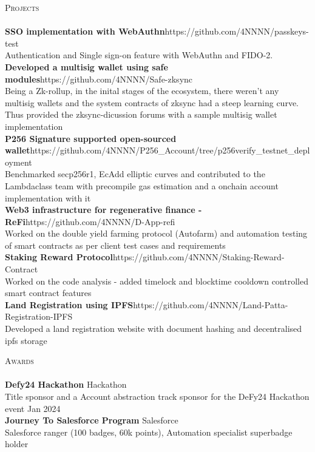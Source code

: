 \documentclass[a4paper]{article}
\newcommand{\lineunder} {
    \vspace*{-8pt} \\
    \hspace*{-18pt} \hrulefill \\
}
\newcommand{\header} [1] {
    {\hspace*{-18pt}\vspace*{6pt} \textsc{#1}}
    \vspace*{-6pt} \lineunder
}
\begin{document}
\header{Projects}
{\textbf{SSO implementation with WebAuthn}}\hfill https://github.com/4NNNN/passkeys-test\\
Authentication and Single sign-on feature with WebAuthn and FIDO-2.\\
\vspace*{2mm}
{\textbf{Developed a multisig wallet using safe modules}}\hfill https://github.com/4NNNN/Safe-zksync\\
Being a Zk-rollup, in the inital stages of the ecosystem, there weren't any multisig wallets and the system contracts of zksync had a steep learning curve. Thus provided the zksync-dicussion forums with a sample multisig wallet implementation\\
\vspace*{2mm}
{\textbf{P256 Signature supported open-sourced wallet}}\hfill https://github.com/4NNNN/P256_Account/tree/p256verify_testnet_deployment\\
Benchmarked secp256r1, EcAdd elliptic curves and contributed to the Lambdaclass team with precompile gas estimation and a onchain account implementation with it\\
\vspace*{2mm}
{\textbf{Web3 infrastructure for regenerative finance - ReFi}}\hfill https://github.com/4NNNN/D-App-refi\\
Worked on the double yield farming protocol (Autofarm) and automation testing of smart contracts as per client test cases and requirements\\
\vspace*{2mm}
{\textbf{Staking Reward Protocol}}\hfill https://github.com/4NNNN/Staking-Reward-Contract\\
Worked on the code analysis - added timelock and blocktime cooldown controlled smart contract features\\
\vspace*{2mm}
{\textbf{Land Registration using IPFS}}\hfill https://github.com/4NNNN/Land-Patta-Registration-IPFS\\
Developed a land registration website with document hashing and decentralised ipfs storage\\
\vspace*{2mm}

\header{Awards}
\textbf{Defy24 Hackathon} \hfill Hackathon\\
Title sponsor and a Account abstraction track sponsor for the DeFy24 Hackathon event \hfill Jan 2024\\
\vspace*{2mm}
\textbf{Journey To Salesforce Program} \hfill Salesforce\\
Salesforce ranger (100 badges, 60k points), Automation specialist superbadge holder
\vspace*{2mm}

\ 
\end{document}
